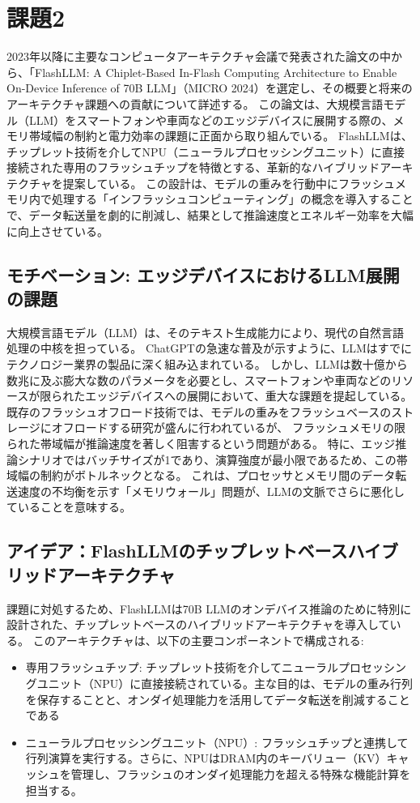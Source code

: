 \documentclass[a4paper, 11pt]{article}
\begin{document}
\section{課題2}
2023年以降に主要なコンピュータアーキテクチャ会議で発表された論文の中から、「FlashLLM: A Chiplet-Based In-Flash Computing Architecture to Enable On-Device Inference of 70B LLM」（MICRO 2024）\cite{yu2024cambriconllmchipletbasedhybridarchitecture}を選定し、その概要と将来のアーキテクチャ課題への貢献について詳述する。
この論文は、大規模言語モデル（LLM）をスマートフォンや車両などのエッジデバイスに展開する際の、メモリ帯域幅の制約と電力効率の課題に正面から取り組んでいる。
FlashLLMは、チップレット技術を介してNPU（ニューラルプロセッシングユニット）に直接接続された専用のフラッシュチップを特徴とする、革新的なハイブリッドアーキテクチャを提案している。
この設計は、モデルの重みを行動中にフラッシュメモリ内で処理する「インフラッシュコンピューティング」の概念を導入することで、データ転送量を劇的に削減し、結果として推論速度とエネルギー効率を大幅に向上させている。

\subsection{モチベーション: エッジデバイスにおけるLLM展開の課題}
大規模言語モデル（LLM）は、そのテキスト生成能力により、現代の自然言語処理の中核を担っている。
ChatGPTの急速な普及が示すように、LLMはすでにテクノロジー業界の製品に深く組み込まれている。
しかし、LLMは数十億から数兆に及ぶ膨大な数のパラメータを必要とし、スマートフォンや車両などのリソースが限られたエッジデバイスへの展開において、重大な課題を提起している。
既存のフラッシュオフロード技術では、モデルの重みをフラッシュベースのストレージにオフロードする研究が盛んに行われているが、
フラッシュメモリの限られた帯域幅が推論速度を著しく阻害するという問題がある。
特に、エッジ推論シナリオではバッチサイズが1であり、演算強度が最小限であるため、この帯域幅の制約がボトルネックとなる。
これは、プロセッサとメモリ間のデータ転送速度の不均衡を示す「メモリウォール」問題が、LLMの文脈でさらに悪化していることを意味する。

\subsection{アイデア：FlashLLMのチップレットベースハイブリッドアーキテクチャ}
課題に対処するため、FlashLLMは70B LLMのオンデバイス推論のために特別に設計された、チップレットベースのハイブリッドアーキテクチャを導入している。
このアーキテクチャは、以下の主要コンポーネントで構成される:
\begin{itemize}
    \item 専用フラッシュチップ: チップレット技術を介してニューラルプロセッシングユニット（NPU）に直接接続されている。主な目的は、モデルの重み行列を保存することと、オンダイ処理能力を活用してデータ転送を削減することである
    \item ニューラルプロセッシングユニット（NPU）: フラッシュチップと連携して行列演算を実行する。さらに、NPUはDRAM内のキーバリュー（KV）キャッシュを管理し、フラッシュのオンダイ処理能力を超える特殊な機能計算を担当する。
\end{itemize}
\end{document}
